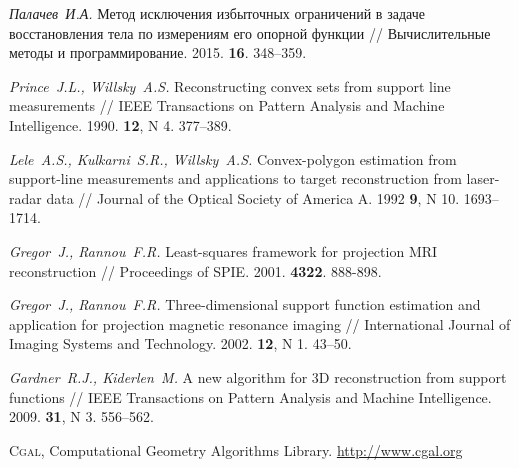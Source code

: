 \documentclass[a4paper, 10pt]{article}
\theoremstyle{definition}
\theoremstyle{plain}
\theoremstyle{plain}
\begin{document}
\begin{thebibliography}{50}

\emph{Палачев~И.А.}
Метод исключения избыточных ограничений в задаче восстановления тела по
измерениям его опорной функции //
Вычислительные методы и программирование.
2015.
\textbf{16}.
348--359.

\emph{Prince~J.L., Willsky~A.S.}
Reconstructing convex sets from support line measurements //
IEEE Transactions on Pattern Analysis and Machine Intelligence.
1990.
\textbf{12},
N 4.
377--389.

\emph{Lele~A.S., Kulkarni~S.R., Willsky~A.S.}
Convex-polygon estimation from support-line measurements and applications to
target reconstruction from laser-radar data //
Journal of the Optical Society of America A.
1992
\textbf{9},
N 10.
1693--1714.

\emph{Gregor~J., Rannou~F.R.}
Least-squares framework for projection {MRI} reconstruction //
Proceedings of SPIE.
2001.
\textbf{4322}.
888-898.

\emph{Gregor~J., Rannou~F.R.}
Three-dimensional support function estimation and application for projection
magnetic resonance imaging //
International Journal of Imaging Systems and Technology.
2002.
\textbf{12},
N 1.
43--50.

\emph{Gardner~R.J., Kiderlen~M.}
A new algorithm for 3D reconstruction from support functions //
IEEE Transactions on Pattern Analysis and Machine Intelligence.
2009.
\textbf{31},
N 3.
556--562.

\textsc{Cgal}, {C}omputational {G}eometry {A}lgorithms {L}ibrary.
\url{http://www.cgal.org}

\end{thebibliography}
\end{document}
